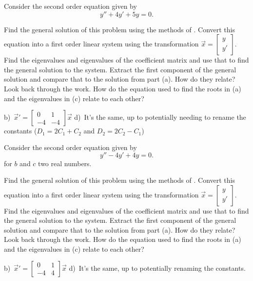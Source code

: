 \begin{exercise}
Consider the second order equation given by
\begin{equation*}
y'' + 4y' + 5y = 0.
\end{equation*}
\begin{tasks}
\task Find the general solution of this problem using the methods of .
\task Convert this equation into a first order linear system using the transformation $\vec{x} = \left[ \begin{smallmatrix} y \\ y' \end{smallmatrix} \right]$. 
\task Find the eigenvalues and eigenvalues of the coefficient matrix and use that to find the general solution to the system.
\task Extract the first component of the general solution and compare that to the solution from part (a). How do they relate?
\task Look back through the work. How do the equation used to find the roots in (a) and the eigenvalues in (c) relate to each other?
\end{tasks}
\end{exercise}
\comboSol{%
}
{%
b)~${\vec{x}}' = \left[\begin{smallmatrix} 0 & 1 \\-4 & -4 \end{smallmatrix}\right]\vec{x}$ \quad d)~It's the same, up to potentially needing to rename the constants ($D_1 = 2C_1 + C_2$ and $D_2 = 2C_2 - C_1$)
}

\begin{exercise}
Consider the second order equation given by
\begin{equation*}
y'' - 4y' + 4y = 0.
\end{equation*} for $b$ and $c$ two real numbers.
\begin{tasks}
\task Find the general solution of this problem using the methods of .
\task Convert this equation into a first order linear system using the transformation $\vec{x} = \left[ \begin{smallmatrix} y \\ y' \end{smallmatrix} \right]$. 
\task Find the eigenvalues and eigenvalues of the coefficient matrix and use that to find the general solution to the system.
\task Extract the first component of the general solution and compare that to the solution from part (a). How do they relate?
\task Look back through the work. How do the equation used to find the roots in (a) and the eigenvalues in (c) relate to each other?
\end{tasks}
\end{exercise}
\comboSol{%
}
{%
b)~${\vec{x}}' = \left[\begin{smallmatrix} 0 & 1 \\-4 & 4 \end{smallmatrix}\right]\vec{x}$ \quad d)~It's the same, up to potentially renaming the constants.
}



